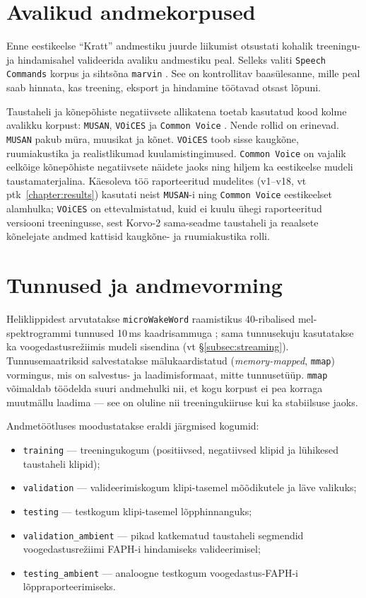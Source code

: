\section{Avalikud andmekorpused}
Enne eestikeelse \enquote{Kratt} andmestiku juurde liikumist otsustati kohalik treeningu- ja hindamisahel valideerida avaliku andmestiku peal. Selleks valiti \texttt{Speech Commands} korpus ja sihtsõna \texttt{marvin} \cite{speechcommands2018}. See on kontrollitav baasülesanne, mille peal saab hinnata, kas treening, eksport ja hindamine töötavad otsast lõpuni.

Taustaheli ja kõnepõhiste negatiivsete allikatena toetab kasutatud kood kolme avalikku korpust: \texttt{MUSAN}, \texttt{VOiCES} ja \texttt{Common Voice} \cite{musan2015,voices2018,commonvoice2020}. Nende rollid on erinevad. \texttt{MUSAN} pakub müra, muusikat ja kõnet. \texttt{VOiCES} toob sisse kaugkõne, ruumiakustika ja realistlikumad kuulamistingimused. \texttt{Common Voice} on vajalik eelkõige kõnepõhiste negatiivsete näidete jaoks ning hiljem ka eestikeelse mudeli taustamaterjalina. Käesoleva töö raporteeritud mudelites (v1--v18, vt ptk~\ref{chapter:results}) kasutati neist \texttt{MUSAN}-i ning \texttt{Common Voice} eestikeelset alamhulka; \texttt{VOiCES} on ettevalmistatud, kuid ei kuulu ühegi raporteeritud versiooni treeningusse, sest Korvo-2 sama-seadme taustaheli ja reaalsete kõnelejate andmed kattisid kaugkõne- ja ruumiakustika rolli.

\section{Tunnused ja andmevorming}
Heliklippidest arvutatakse \texttt{microWakeWord} raamistikus 40-ribalised mel-spektrogrammi tunnused 10\,ms kaadrisammuga \cite{microwakeword2026}; sama tunnusekuju kasutatakse ka voogedastusrežiimis mudeli sisendina (vt §\ref{subsec:streaming}). Tunnusemaatriksid salvestatakse mälukaardistatud (\emph{memory-mapped}, \texttt{mmap}) vormingus, mis on salvestus- ja laadimisformaat, mitte tunnusetüüp. \texttt{mmap} võimaldab töödelda suuri andmehulki nii, et kogu korpust ei pea korraga muutmällu laadima --- see on oluline nii treeningukiiruse kui ka stabiilsuse jaoks.

Andmetöötluses moodustatakse eraldi järgmised kogumid:
\begin{itemize}
    \item \texttt{training} --- treeningukogum (positiivsed, negatiivsed klipid ja lühikesed taustaheli klipid);
    \item \texttt{validation} --- valideerimiskogum klipi-tasemel mõõdikutele ja läve valikuks;
    \item \texttt{testing} --- testkogum klipi-tasemel lõpphinnanguks;
    \item \texttt{validation\_ambient} --- pikad katkematud taustaheli segmendid voogedastusrežiimi FAPH-i hindamiseks valideerimisel;
    \item \texttt{testing\_ambient} --- analoogne testkogum voogedastus-FAPH-i lõppraporteerimiseks.
\end{itemize}

